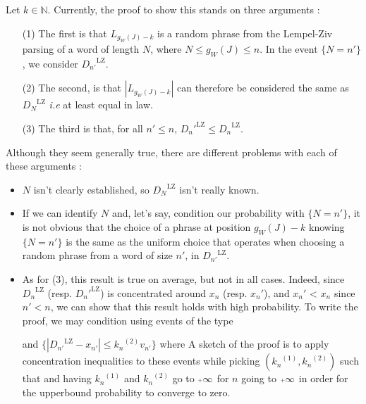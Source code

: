 
\label{app:critics}
Let $k \in\mathbb{N}$.
Currently, the proof to show this stands on three arguments :

\begin{itemize}
    \item[(1)] The first is that $L_{g_W(J)-k}$ is  
          a random phrase from the Lempel-Ziv parsing of 
          a word of length $N$, where $N \leq g_W(J) \leq n$.
          In the event $\{ N = n' \}$, we consider 
          ${D_{n'}}^{\text{LZ}}$.

    \item[(2)] The second, is that $|L_{g_W(J)-k}|$ can 
          therefore be considered the same as ${D_N}^{\text{LZ}}$
          \textit{i.e} at least equal in law.

    \item[(3)] The third is that, for all $n'\leq n$, 
        ${D_n'}^{\text{LZ}} \leq {D_n}^{\text{LZ}}$.
\end{itemize}
Although they seem generally true,
there are different problems with each of these arguments :

\begin{itemize}
    \item $N$ isn't clearly established, so 
          ${D_N}^{\text{LZ}}$ isn't really known.

    \item If we can identify $N$ and, let's say,
          condition our probability with $\{ N = n' \}$, 
          it is not obvious
          that the choice of a phrase at position ${g_W(J)-k}$
          knowing $\{ N = n' \}$
          is the same as the uniform choice that operates
          when choosing a random phrase from a word of size
          $n'$, in ${D_{n'}}^{\text{LZ}}$.

    \item As for (3), this result is true on average, but 
          not in all cases. Indeed, since ${D_n}^{\text{LZ}}$
          (resp. ${D_n'}^{\text{LZ}}$) is concentrated
          around $x_n$ (resp. $x_n'$), and $x_n'$ < $x_n$
          since $n' < n$, we can show 
          that this result holds with high probability.
          To write the proof, we may condition using
          events of the type


          \leftcenters
            {and}
            {$\{ | {D_{n'}}^{\text{LZ}} - x_{n'} | \leq {k_n}^{(2)} v_{n'} \} $}
          where 
          \noindent
          A sketch of the proof is to
          apply concentration 
          inequalities to these events 
          while picking $({k_n}^{(1)}, {k_n}^{(2)})$ such that 
          \noindent
          and having ${k_n}^{(1)}$ and ${k_n}^{(2)}$ go to $\pinf$ for 
          $n$ going to $\pinf$ in order for the upperbound probability
          to converge to zero. 
\end{itemize}